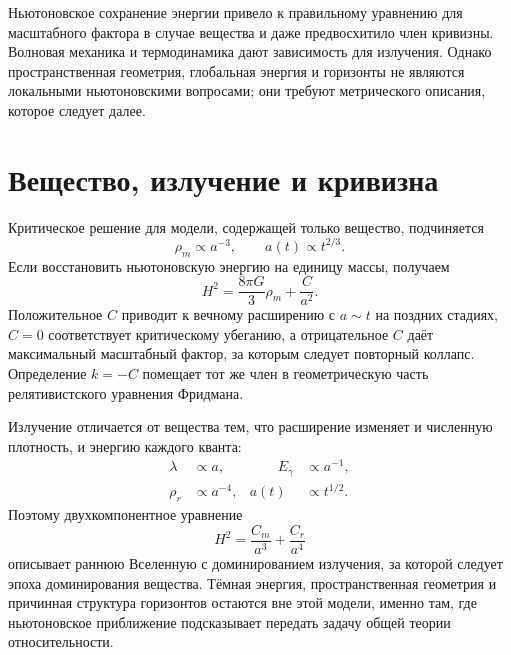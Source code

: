 Ньютоновское сохранение энергии привело к правильному уравнению для масштабного фактора в случае вещества и даже предвосхитило член кривизны. Волновая механика и термодинамика дают зависимость для излучения. Однако пространственная геометрия, глобальная энергия и горизонты не являются локальными ньютоновскими вопросами; они требуют метрического описания, которое следует далее.

\section{Вещество, излучение и кривизна}

Критическое решение для модели, содержащей только вещество, подчиняется
\begin{equation}
\rho_m\propto a^{-3},
\qquad
a(t)\propto t^{2/3}.
\end{equation}
Если восстановить ньютоновскую энергию на единицу массы, получаем
\begin{equation}
H^2=\frac{8\pi G}{3}\rho_m+\frac{C}{a^2}.
\end{equation}
Положительное \(C\) приводит к вечному расширению с \(a\sim t\) на поздних стадиях, \(C=0\) соответствует критическому убеганию, а отрицательное \(C\) даёт максимальный масштабный фактор, за которым следует повторный коллапс. Определение \(k=-C\) помещает тот же член в геометрическую часть релятивистского уравнения Фридмана.

Излучение отличается от вещества тем, что расширение изменяет и численную плотность, и энергию каждого кванта:
\begin{equation}
\begin{aligned}
\lambda&\propto a,
&\qquad E_\gamma&\propto a^{-1},\\
\rho_r&\propto a^{-4},
& a(t)&\propto t^{1/2}.
\end{aligned}
\end{equation}
Поэтому двухкомпонентное уравнение
\begin{equation}
H^2=\frac{C_m}{a^3}+\frac{C_r}{a^4}
\end{equation}
описывает раннюю Вселенную с доминированием излучения, за которой следует эпоха доминирования вещества. Тёмная энергия, пространственная геометрия и причинная структура горизонтов остаются вне этой модели, именно там, где ньютоновское приближение подсказывает передать задачу общей теории относительности.